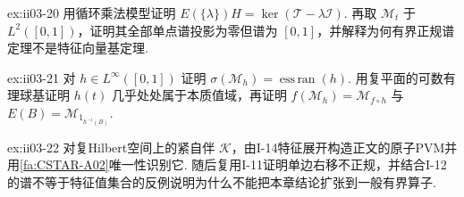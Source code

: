 \begin{FAExercise}[谱原子与非原子谱]{ex:ii03-20}
用循环乘法模型证明 \(\displaystyle E(\{\lambda\})H=\ker(\mathcal T-\lambda\mathcal I)\). 再取 \(\displaystyle\mathcal M_t\) 于 \(\displaystyle L^2([0,1])\)，证明其全部单点谱投影为零但谱为 \(\displaystyle[0,1]\)，并解释为何有界正规谱定理不是特征向量基定理.
\end{FAExercise}

\begin{FAExercise}[乘法算子模型的本质值域与投影值测度]{ex:ii03-21}
对 \(\displaystyle h\in L^\infty([0,1])\) 证明 \(\displaystyle\sigma(\mathcal M_h)=\operatorname{ess\,ran}(h)\). 用复平面的可数有理球基证明 \(\displaystyle h(t)\) 几乎处处属于本质值域，再证明 \(\displaystyle f(\mathcal M_h)=\mathcal M_{f\circ h}\) 与 \(\displaystyle E(B)=\mathcal M_{1_{h^{-1}(B)}}\).
\end{FAExercise}

\begin{FAExercise}[I-14原子桥与移位算子模型边界]{ex:ii03-22}
对复Hilbert空间上的紧自伴 \(\displaystyle\mathcal K\)，由I-14特征展开构造正文的原子PVM并用\autoref{fa:CSTAR-A02}唯一性识别它. 随后复用I-11证明单边右移不正规，并结合I-12的谱不等于特征值集合的反例说明为什么不能把本章结论扩张到一般有界算子.
\end{FAExercise}

